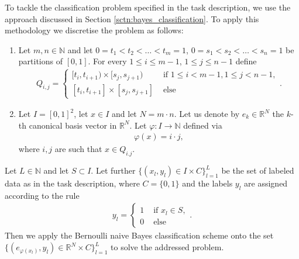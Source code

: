 To tackle the classification problem specified in the task description, we use the approach discussed in Section \ref{sctn:bayes_classification}. To apply this methodology we discretise the problem as follows:
\begin{enumerate}
	\item Let $m,n \in\mathbb{N}$ and let $0 = t_{1} < t_{2} < \ldots < t_{m} = 1$, 
		$0 = s_{1} < s_{2} < \ldots < s_{n} = 1$ be partitions of $[0, 1]$. For every $1\leq i\leq m - 1$, 
		$1\leq j\leq n - 1$ define  
		\begin{align*}
			Q_{i, j} = 
			\begin{cases}
				[t_{i}, t_{i + 1})\times[s_{j}, s_{j + 1}) & \text{ if } 1\leq i < m - 1, 1\leq j < n - 1,\\
				[t_{i}, t_{i + 1}]\times[s_{j}, s_{j + 1}] & \text{ else }
			\end{cases}.
		\end{align*}
	\item Let $I=[0, 1]^{2}$, let $x\in I$ and let $N = m\cdot n$. Let us denote by $e_{k}\in\mathbb{R}^{N}$ 
		the $k$-th canonical basis vector in $\mathbb{R}^{N}$. Let $\varphi:I\rightarrow\mathbb{N}$ defined via
		\begin{align*}
			\varphi(x) = i\cdot j,
		\end{align*}
		where $i, j$ are such that $x\in Q_{i. j}$. 
\end{enumerate}

Let $L\in\mathbb{N}$ and let $S\subset I$. Let further $\{(x_{l}, y_{l})\in I\times C\}_{l = 1}^{L}$ be the set of labeled data as in the task description, where $C=\{0, 1\}$ and the labels $y_{l}$ are assigned according to the rule
\begin{align*}
	y_{l} = 
	\begin{cases}
		1 & \text{ if } x_{l}\in S, \\
		0 & \text{ else}
	\end{cases}.
\end{align*}
Then we apply the Bernoulli naive Bayes classification scheme onto the set $\{(e_{\varphi(x_{l})}, y_{l})\in\mathbb{R}^{N}\times C\}_{l = 1}^{L}$ to solve the addressed problem. 

